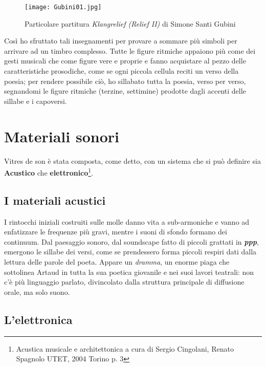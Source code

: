 \begin{figure}[htbp]
\begin{center}
\texttt{[image: Gubini01.jpg]}
\caption{Particolare partitura \textit{Klangrelief (Relief II)} di Simone Santi Gubini}
\label{fig:gubini}
\end{center}
\end{figure}

Così ho sfruttato tali insegnamenti per provare a sommare più simboli per arrivare ad un timbro complesso.
Tutte le figure ritmiche appaiono più come dei gesti musicali che come figure vere e proprie e fanno acquistare al pezzo delle caratteristiche prosodiche, come se ogni piccola cellula reciti un verso della poesia; per rendere possibile ciò, ho sillabato tutta la poesia, verso per verso, segnandomi le figure ritmiche (terzine, settimine) prodotte dagli accenti delle sillabe e i capoversi.

\section{Materiali sonori}

Vitres de son è stata composta, come detto, con un sistema che si può definire sia \textbf{Acustico} che \textbf{elettronico}\footnote{Acustica musicale e architettonica a cura di Sergio Cingolani, Renato Spagnolo UTET, 2004 Torino p. 3}.


\subsection*{I materiali acustici}

I rintocchi iniziali costruiti sulle molle danno vita a sub-armoniche e vanno ad enfatizzare le frequenze più gravi, mentre i suoni di sfondo formano dei continuum. Dal paesaggio sonoro, dal soundscape fatto di piccoli grattati in \textbf{\textit{ppp}}, emergono le sillabe dei versi, come se prendessero forma piccoli respiri dati dalla lettura delle parole del poeta. Appare un \textit{dramma}, un enorme piaga che sottolinea Artaud in tutta la sua poetica giovanile e nei suoi lavori teatrali: non c'è più linguaggio parlato, divincolato dalla struttura principale di diffusione orale, ma solo suono.


\subsection*{L'elettronica}

